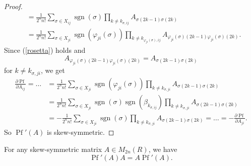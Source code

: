 \documentclass[a4paper,openany]{scrbook}
\begin{document}
\begin{proof}
\begin{align*}
        &= \frac{1}{2^n n!} \sum_{\sigma \in X_{ij}} \operatorname{sgn}(\sigma)  \prod_{k \not = k_{\sigma,ij}} A_{\sigma(2k-1) \sigma(2k)} \\
        &= \frac{1}{2^n n!} \sum_{\sigma \in X_{ji}} \operatorname{sgn}(\varphi_{ji}(\sigma)) \prod_{k \not = k_{\varphi_{ji}(\sigma),ij}} A_{\varphi_{ji}(\sigma)(2k-1) \varphi_{ji}(\sigma)(2k)}.
    \end{align*}
    Since (\ref{rosetta}) holds  and
    $$A_{\varphi_{ji}(\sigma)(2k-1) \varphi_{ji}(\sigma)(2k)} = A_{\sigma(2k-1) \sigma(2k)}$$
    for $k \not = k_{\sigma,ji}$, we get
    \begin{align*}
        \frac{\partial\operatorname{Pf}}{\partial A_{ij}} = \dots &= \frac{1}{2^n n!} \sum_{\sigma \in X_{ji}} \operatorname{sgn}(\varphi_{ji}(\sigma)) \prod_{k \not = k_{\sigma,ji}} A_{\sigma(2k-1) \sigma(2k)} \\
        &= \frac{1}{2^n n!} \sum_{\sigma \in X_{ji}} \operatorname{sgn}(\sigma)\operatorname{sgn}(\beta_{k_{\sigma,ij}}) \prod_{k \not = k_{\sigma,ji}} A_{\sigma(2k-1) \sigma(2k)} \\
        &= - \frac{1}{2^n n!} \sum_{\sigma \in X_{ji}} \operatorname{sgn}(\sigma) \prod_{k \not = k_{\sigma,ji}} A_{\sigma(2k-1) \sigma(2k)} = \dots = - \frac{\partial\operatorname{Pf}}{\partial A_{ji}}.
    \end{align*}
    So $\operatorname{Pf}'(A)$ is skew-symmetric.
\end{proof}

\begin{lemma}
    For any skew-symmetric matrix $A\in M_{2n}(R)$, we have
    $$\operatorname{Pf}'(A)A = A\operatorname{Pf}'(A).$$
\end{lemma}
\end{document}
